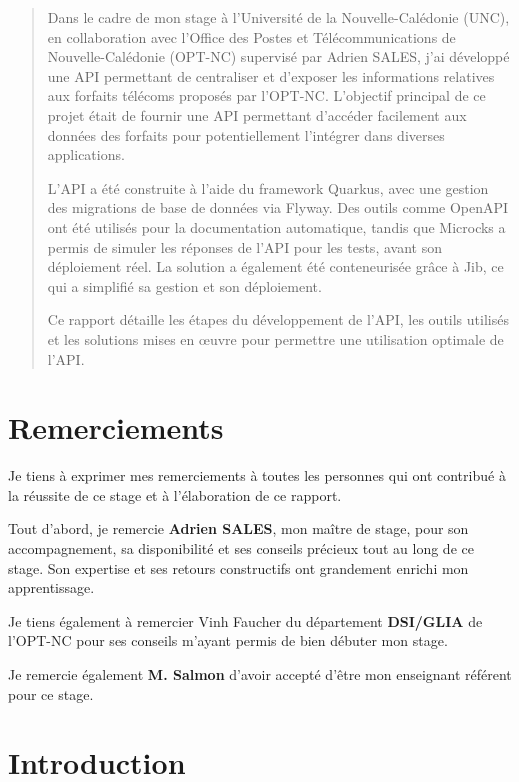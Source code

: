 \documentclass{article}
\begin{document}
	\newpage
	\begin{abstract}
		Dans le cadre de mon stage à l'Université de la Nouvelle-Calédonie (UNC), en collaboration avec l'Office des Postes et Télécommunications de Nouvelle-Calédonie (OPT-NC) supervisé par Adrien SALES, j'ai développé une API permettant de centraliser et d'exposer les informations relatives aux forfaits télécoms proposés par l'OPT-NC. L'objectif principal de ce projet était de fournir une API permettant d’accéder facilement aux données des forfaits pour potentiellement l'intégrer dans diverses applications.
		
		L'API a été construite à l'aide du framework Quarkus, avec une gestion des migrations de base de données via Flyway. Des outils comme OpenAPI ont été utilisés pour la documentation automatique, tandis que Microcks a permis de simuler les réponses de l'API pour les tests, avant son déploiement réel. La solution a également été conteneurisée grâce à Jib, ce qui a simplifié sa gestion et son déploiement. 
		
		Ce rapport détaille les étapes du développement de l'API, les outils utilisés et les solutions mises en œuvre pour permettre une utilisation optimale de l'API.
	\end{abstract}

	\newpage
	\section*{Remerciements}
	
	Je tiens à exprimer mes remerciements à toutes les personnes qui ont contribué à la réussite de ce stage et à l’élaboration de ce rapport.
	
	Tout d’abord, je remercie \textbf{Adrien SALES}, mon maître de stage, pour son accompagnement, sa disponibilité et ses conseils précieux tout au long de ce stage. Son expertise et ses retours constructifs ont grandement enrichi mon apprentissage.
	
	Je tiens également à remercier Vinh Faucher du département \textbf{DSI/GLIA} de l’OPT-NC pour ses conseils m'ayant permis de bien débuter mon stage.
	
	Je remercie également \textbf{M. Salmon} d’avoir accepté d’être mon enseignant référent pour ce stage.
		
	\newpage
	\tableofcontents
	\newpage
	\section{Introduction}
	
\end{document}
